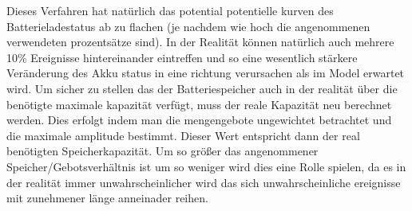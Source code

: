 Dieses Verfahren hat natürlich das potential potentielle kurven des Batterieladestatus ab zu flachen (je nachdem wie hoch die angenommenen verwendeten
prozentsätze sind). In der Realität können natürlich auch mehrere 10\% Ereignisse hintereinander eintreffen und so eine wesentlich stärkere
Veränderung des Akku status in eine richtung verursachen als im Model erwartet wird. Um sicher zu stellen das der Batteriespeicher auch in der realität
über die benötigte maximale kapazität verfügt, muss der reale Kapazität neu berechnet werden. Dies erfolgt indem man die mengengebote ungewichtet betrachtet
und die maximale amplitude bestimmt. Dieser Wert entspricht dann der real benötigten Speicherkapazität.
Um so größer das angenommener Speicher/Gebotsverhältnis ist um so weniger wird dies eine Rolle spielen, da es in der
realität immer unwahrscheinlicher wird das sich unwahrscheinliche ereignisse mit zunehmener länge anneinader reihen.

